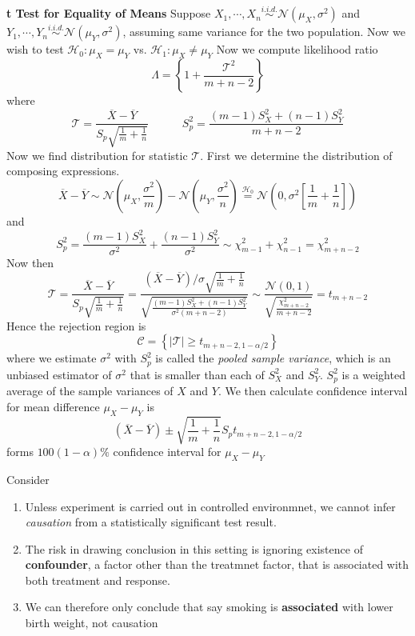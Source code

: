 \documentclass[11pt]{article}
\begin{document}
\begin{example}
  \textbf{t Test for Equality of Means} Suppose $X_1, \cdots, X_n \stackrel{i.i.d.}{\sim} \mathcal{N}(\mu_X, \sigma^2)$ and  $Y_1, \cdots, Y_n \stackrel{i.i.d.}{\sim} \mathcal{N}(\mu_Y, \sigma^2)$, assuming same variance for the two population. Now we wish to test $\mathcal{H}_0: \mu_X = \mu_Y$ vs. $\mathcal{H}_1:\mu_X \neq \mu_Y$ Now we compute likelihood ratio
  \[
    \Lambda = \left\{ 1 + \frac{\mathcal{T}^2}{m+n-2} \right\}
  \]
  where
  \[
    \mathcal{T} = \frac{\overline{X} - \overline{Y}}{S_p \sqrt{\frac{1}{m} + \frac{1}{n}}} \quad\quad\quad S_p^2 = \frac{(m-1)S_X^2 + (n-1)S_Y^2}{m+n-2}
  \]
  Now we find distribution for statistic $\mathcal{T}$. First we determine the distribution of composing expressions.
  \[
    \overline{X} - \overline{Y} \sim \mathcal{N}(\mu_X, \frac{\sigma^2}{m}) - \mathcal{N}(\mu_Y, \frac{\sigma^2}{n}) \stackrel{\mathcal{H}_0}{=} \mathcal{N}(0, \sigma^2 [\frac{1}{m} + \frac{1}{n}])
  \]
  and
  \[
    S_p^2 = \frac{(m-1)S_X^2}{\sigma^2} + \frac{(n-1)S_Y^2}{\sigma^2} \sim \chi_{m-1}^2 + \chi_{n-1}^2 = \chi_{m+n-2}^2
  \]
  Now then
  \[
    \mathcal{T} = \frac{\overline{X} - \overline{Y}}{S_p \sqrt{\frac{1}{m} + \frac{1}{n}}} = \frac{(\overline{X} - \overline{Y}) / \sigma \sqrt{\frac{1}{m} + \frac{1}{n}}}{\sqrt{ \frac{ (m-1)S_X^2 + (n-1)S_Y^2 }{ \sigma^2(m+n-2) }  }} \sim \frac{\mathcal{N}(0,1)}{\sqrt{\frac{\chi_{m+n-2}^2}{m+n-2}}} = t_{m+n-2}
  \]
  Hence the rejection region is
  \[
    \mathcal{C} = \left\{ |\mathcal{T}| \geq t_{m+n-2, 1-\alpha/2} \right\}
  \]
  where we estimate $\sigma^2$ with $S_p^2$ is called the \textit{pooled sample variance}, which is an unbiased estimator of $\sigma^2$ that is smaller than each of $S_X^2$ and $S_Y^2$. $S_p^2$ is a weighted average of the sample variances of $X$ and $Y$. We then calculate confidence interval for mean difference $\mu_X - \mu_Y$ is
  \[
    (\overline{X} - \overline{Y}) \pm \sqrt{\frac{1}{m} + \frac{1}{n}} S_p t_{m+n-2, 1-\alpha/2}
  \]
  forms $100(1-\alpha)\%$ confidence interval for $\mu_X - \mu_Y$
\end{example}



\begin{note}
  Consider
  \begin{enumerate}
    \item Unless experiment is carried out in controlled environmnet, we cannot infer \textit{causation} from a statistically significant test result.
    \item The risk in drawing conclusion in this setting is ignoring existence of \textbf{confounder}, a factor other than the treatmnet factor, that is associated with both treatment and response.
    \item We can therefore only conclude that say smoking is \textbf{associated} with lower birth weight, not causation
  \end{enumerate}
\end{note}
\end{document}
